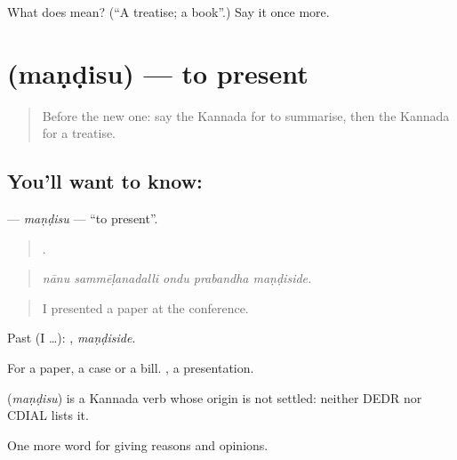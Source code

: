 \begin{tcolorbox}[breakable,colback=teal!4,colframe=teal!35!black,title={Before you move on}]
What does  mean? (\textquotedblleft{}A treatise; a book\textquotedblright{}.) Say it once more.
\end{tcolorbox}
\section[\texorpdfstring{\kn{ಮಂಡಿಸು} (maṇḍisu)}{ಮಂಡಿಸು (maṇḍisu)}]{ (maṇḍisu) — to present}

\label{lesson:KA-C409-mandisu}



\begin{quote}
Before the new one: say the Kannada for to summarise, then the Kannada for a treatise.
\end{quote}

\subsection*{You'll want to know: }
\textbf{} — \emph{maṇḍisu} — \textquotedblleft{}to present\textquotedblright{}.

\begin{quote}
    .
\end{quote}

\begin{quote}
\emph{nānu sammēḷanadalli ondu prabandha maṇḍiside.}
\end{quote}

\begin{quote}
I presented a paper at the conference.
\end{quote}

Past (I …): , \emph{maṇḍiside}.

For a paper, a case or a bill. , a presentation.

\begin{cousinweb}
\textbf{} (\emph{maṇḍisu}) is a Kannada verb whose origin is not settled: neither DEDR nor CDIAL lists it.
\end{cousinweb}

\begin{grammarlens}[title={What you've built}]
One more word for giving reasons and opinions.
\end{grammarlens}

